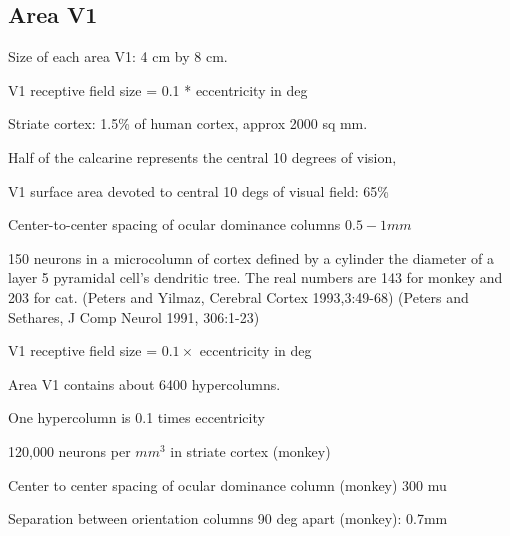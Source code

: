 \subsection*{Area V1}

\be

\item Size of each area V1: 4 cm by 8 cm.

\item V1 receptive field size = 0.1 * eccentricity in deg

\item Striate cortex: 1.5\% of human cortex, approx 2000 sq mm. 

\item Half of the calcarine represents the central 10 degrees of
vision, 

\item V1 surface area devoted to central 10 degs of visual field: 65\%

\item Center-to-center spacing of ocular dominance columns $0.5 - 1 mm$ 

\item 150 neurons in a microcolumn of cortex defined by a cylinder the
diameter of a layer 5 pyramidal cell's dendritic tree.  The real
numbers are 143 for monkey and 203 for cat.
(Peters and Yilmaz, Cerebral Cortex 1993,3:49-68) 
(Peters and Sethares, J Comp Neurol 1991, 306:1-23)

\item V1 receptive field size = $0.1 \times $ eccentricity in deg

\item Area V1 contains about 6400 hypercolumns.


\item One hypercolumn is 0.1 times eccentricity 

\item 120,000 neurons per ${mm}^3$ in striate cortex (monkey)

\item Center to center spacing of ocular dominance column (monkey) 300 mu

\item Separation between orientation columns 90 deg apart (monkey): 0.7mm

